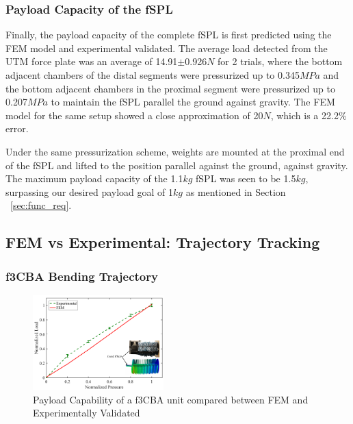 \documentclass[letterpaper, 10 pt, conference]{ieeeconf}  %
\begin{document}
\subsubsection{Payload Capacity of the fSPL}

Finally, the payload capacity of the complete fSPL is first predicted using the FEM model and experimental validated. The average load detected from the UTM force plate was an average of 14.91$\pm$0.926$N$ for 2 trials, where the bottom adjacent chambers of the distal segments were pressurized up to 0.345$MPa$ and the bottom adjacent chambers in the proximal segment were pressurized up to 0.207$MPa$ to maintain the fSPL parallel the ground against gravity. The FEM model for the same setup showed a close approximation of 20$N$, which is a 22.2\% error. 

Under the same pressurization scheme, weights are mounted at the proximal end of the fSPL and lifted to the position parallel against the ground, against gravity. The maximum payload capacity of the 1.1$kg$ fSPL was seen to be 1.5$kg$, surpassing our desired payload goal of 1$kg$ as mentioned in Section ~\ref{sec:func_req}.


\subsection{FEM vs Experimental: Trajectory Tracking}

\subsubsection{f3CBA Bending Trajectory}

\begin{figure}[b!]
\centering
\includegraphics[width=0.45\textwidth]{Figures/3CA_instron}
\caption{Payload Capability of a f3CBA unit compared between FEM and Experimentally Validated}
\label{fig:f3CAs_load_fem_real}
\vspace{-1.5em}
\end{figure}
\end{document}
